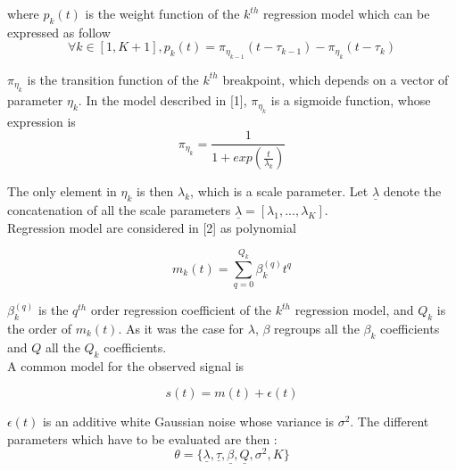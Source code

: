 where $p_k(t)$ is the weight function of the $k^{th}$ regression model which can be expressed as follow
\begin{equation}
\forall k\in [1,K+1], p_k(t)= \pi_{\eta_{k-1}}(t-\tau_{k-1})-\pi_{\eta_{k}}(t-\tau_{k})
\end{equation}

$\pi_{\eta_{k}}$ is the transition function of the $k^{th}$ breakpoint, which depends on a vector of parameter $\eta_{k}$. In the model described in [1], $\pi_{\eta_{k}}$ is a sigmoide function, whose expression is 
\begin{equation}
\pi_{\eta_{k}} = \frac{1}{1+exp(\frac{t}{\lambda_k})}
\end{equation}

The only element in $\eta_{k}$ is then $\lambda_k$, which is a scale parameter. Let $\underline{\lambda}$ denote the concatenation of all the scale parameters $\underline{\lambda} = [\lambda_1,...,\lambda_K]$.
\\

 Regression model are considered in [2] as polynomial 

\begin{equation}
m_k(t)= \sum_{q=0}^{Q_k} \beta^{(q)} _kt^q
\end{equation}

$\beta^{(q)} _k$ is the $q^{th}$ order regression coefficient of the $k^{th}$ regression model, and $Q_k$ is the order of $m_k(t)$. As it was the case for $\lambda$, $\beta$ regroups all the $\beta_k$ coefficients and $Q$ all the $Q_k$ coefficients.
\\

A common model for the observed signal is 


\begin{equation}
s(t)=m(t) + \epsilon (t)
\end{equation}

$\epsilon (t)$ is an additive white Gaussian noise whose variance is $\sigma^2$. The different parameters which have to be evaluated are then :
\begin{equation}
\theta=\{\underline{\lambda},\underline{\tau},\underline{\beta},\underline{Q},\sigma ^2,K\}
\end{equation}
\\


